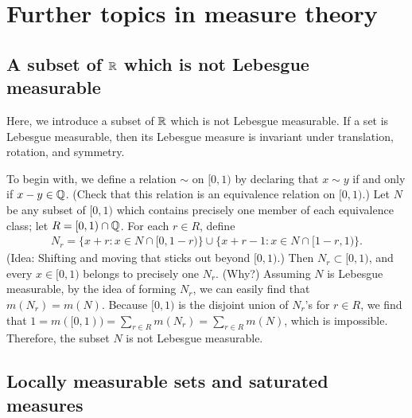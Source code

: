 \section{Further topics in measure theory}

\subsection{A subset of ${\mathbb{R}}$ which is not Lebesgue measurable}

Here, we introduce a subset of ${\mathbb{R}}$ which is not Lebesgue measurable.
If a set is Lebesgue measurable, then its Lebesgue measure is invariant under translation, rotation, and symmetry.

To begin with, we define a relation $\sim$ on $[0, 1)$ by declaring that $x\sim y$ if and only if $x-y\in{\mathbb{Q}}$. \color{brown}(Check that this relation is an equivalence relation on $[0, 1)$.) \color{black}
Let $N$ be any subset of $[0, 1)$ which contains precisely one member of each equivalence class; let $R=[0, 1)\cap{\mathbb{Q}}$.
For each $r\in R$, define
\begin{eqnarray*}
    N_r=\{x+r: x\in N\cap[0, 1-r)\} \cup \{x+r-1: x\in N\cap[1-r, 1)\}.
\end{eqnarray*}
(Idea: Shifting and moving that sticks out beyond $[0, 1)$.)
Then $N_r\subset[0, 1)$, and every $x\in [0, 1)$ belongs to precisely one $N_r$. \color{brown}(Why?) \color{black}
Assuming $N$ is Lebesgue measurable, by the idea of forming $N_r$, we can easily find that $m(N_r)=m(N)$.
Because $[0, 1)$ is the disjoint union of $N_r$'s for $r\in R$, we find that $1=m([0, 1))=\sum_{r\in R}m(N_r)=\sum_{r\in R}m(N)$, which is impossible.
Therefore, the subset $N$ is not Lebesgue measurable.

\subsection{Locally measurable sets and saturated measures}

